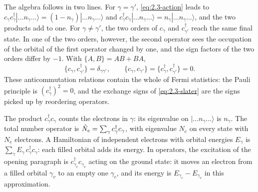 The algebra follows in two lines. For $\gamma = \gamma'$, \cref{eq:2.3-action} leads to $c_\gamma c^\dagger_\gamma|\dots n_\gamma\dots\rangle = (1 - n_\gamma)|\dots n_\gamma\dots\rangle$ and $c^\dagger_\gamma c_\gamma|\dots n_\gamma\dots\rangle = n_\gamma|\dots n_\gamma\dots\rangle$, and the two products add to one. For $\gamma \ne \gamma'$, the two orders of $c_\gamma$ and $c^\dagger_{\gamma'}$ reach the same final state. In one of the two orders, however, the second operator sees the occupation of the orbital of the first operator changed by one, and the sign factors of the two orders differ by $-1$. With $\{A, B\} = AB + BA$,
\begin{equation}
  \{c_\gamma, c^\dagger_{\gamma'}\} = \delta_{\gamma\gamma'}, \qquad \{c_\gamma, c_{\gamma'}\} = \{c^\dagger_\gamma, c^\dagger_{\gamma'}\} = 0 .
  \label{eq:2.3-anticomm}
\end{equation}
These anticommutation relations contain the whole of Fermi statistics: the Pauli principle is $(c^\dagger_\gamma)^2 = 0$, and the exchange signs of \cref{eq:2.3-slater} are the signs picked up by reordering operators.

The product $c^\dagger_\gamma c_\gamma$ counts the electrons in $\gamma$: its eigenvalue on $|\dots n_\gamma\dots\rangle$ is $n_\gamma$. The total number operator is $\hat{N}_e = \sum_\gamma c^\dagger_\gamma c_\gamma$, with eigenvalue $N_e$ on every state with $N_e$ electrons. A Hamiltonian of independent electrons with orbital energies $E_\gamma$ is $\sum_\gamma E_\gamma\,c^\dagger_\gamma c_\gamma$: each filled orbital adds its energy. In operators, the excitation of the opening paragraph is $c^\dagger_{\gamma_c}c_{\gamma_v}$ acting on the ground state: it moves an electron from a filled orbital $\gamma_v$ to an empty one $\gamma_c$, and its energy is $E_{\gamma_c} - E_{\gamma_v}$ in this approximation.

